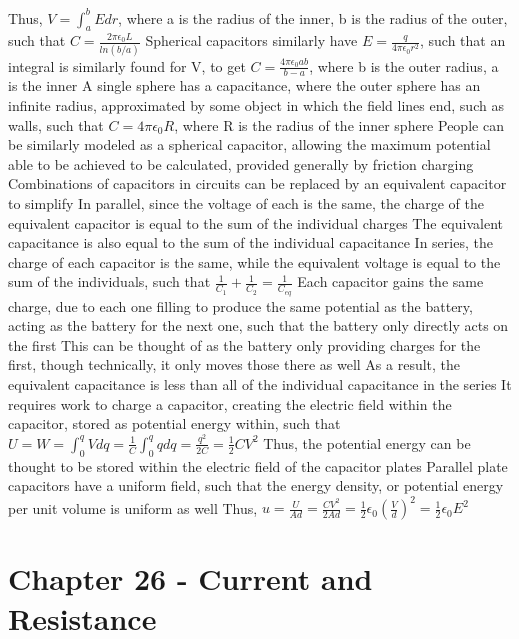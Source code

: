 \documentclass[11 pt, twoside]{article}
\newenvironment{outline*}
{
	\begin{outline}[enumerate]
	}
	{\end{outline}
}
\begin{document}
\begin{outline*}
\3 Thus, $V = \int^b_a Edr$, where a is the radius of the inner, b is the radius of the outer, such that $C = \frac{2\pi\epsilon_0L}{ln(b/a)}$
\2 Spherical capacitors similarly have $E = \frac{q}{4\pi\epsilon_0r^2}$, such that an integral is similarly found for V, to get $C = \frac{4\pi\epsilon_0ab}{b-a}$, where b is the outer radius, a is the inner
\3 A single sphere has a capacitance, where the outer sphere has an infinite radius, approximated by some object in which the field lines end, such as walls, such that $C = 4\pi\epsilon_0R$, where R is the radius of the inner sphere
\4 People can be similarly modeled as a spherical capacitor, allowing the maximum potential able to be achieved to be calculated, provided generally by friction charging
\1 Combinations of capacitors in circuits can be replaced by an equivalent capacitor to simplify
\2 In parallel, since the voltage of each is the same, the charge of the equivalent capacitor is equal to the sum of the individual charges
\3 The equivalent capacitance is also equal to the sum of the individual capacitance
\2 In series, the charge of each capacitor is the same, while the equivalent voltage is equal to the sum of the individuals, such that $\frac{1}{C_1} + \frac{1}{C_2} = \frac{1}{C_{eq}}$
\3 Each capacitor gains the same charge, due to each one filling to produce the same potential as the battery, acting as the battery for the next one, such that the battery only directly acts on the first
\4 This can be thought of as the battery only providing charges for the first, though technically, it only moves those there as well
\3 As a result, the equivalent capacitance is less than all of the individual capacitance in the series
\1 It requires work to charge a capacitor, creating the electric field within the capacitor, stored as potential energy within, such that $U = W = \int^q_0 Vdq = \frac{1}{C} \int^q_0 qdq = \frac{q^2}{2C} = \frac{1}{2}CV^2$
\2 Thus, the potential energy can be thought to be stored within the electric field of the capacitor plates
\2 Parallel plate capacitors have a uniform field, such that the energy density, or potential energy per unit volume is uniform as well
\3 Thus, $u = \frac{U}{Ad} = \frac{CV^2}{2Ad} = \frac{1}{2}\epsilon_0(\frac{V}{d})^2 = \frac{1}{2}\epsilon_0E^2$
\3 
\end{outline*}

\section{Chapter 26 - Current and Resistance}
\end{document}
